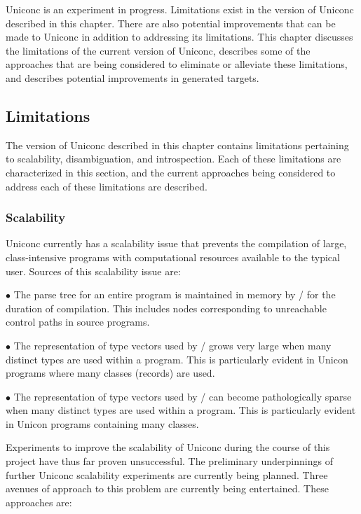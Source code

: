 Uniconc is an experiment in progress. Limitations exist in the version of
Uniconc described in this chapter. There are also potential improvements that
can be made to Uniconc in addition to addressing its limitations. This chapter
discusses the limitations of the current version of Uniconc, describes some of
the approaches that are being considered to eliminate or alleviate these
limitations, and describes potential improvements in generated targets.

\subsection{Limitations}

The version of Uniconc described in this chapter contains limitations pertaining
to scalability, disambiguation, and introspection. Each of these limitations are
characterized in this section, and the current approaches being considered to
address each of these limitations are described.

\subsubsection{Scalability}

Uniconc currently has a scalability issue that prevents the compilation of
large, class-intensive programs with computational resources available to the
typical user.  Sources of this scalability issue are:

$\bullet$ The parse tree for an entire program is maintained in memory by \Ic/
for the duration of compilation. This includes nodes corresponding to
unreachable control paths in source programs.
 
$\bullet$ The representation of type vectors used by \Ic/ grows very large
when many distinct types are used within a program.  This is particularly
evident in Unicon programs where many classes (records) are used.

$\bullet$ The representation of type vectors used by \Ic/ can become
pathologically sparse when many distinct types are used within a program. This
is particularly evident in Unicon programs containing many classes.

Experiments to improve the scalability of Uniconc during the course of this
project have thus far proven unsuccessful. The preliminary underpinnings of
further Uniconc scalability experiments are currently being planned.
Three avenues of approach to this problem are currently being entertained.
These approaches are:


